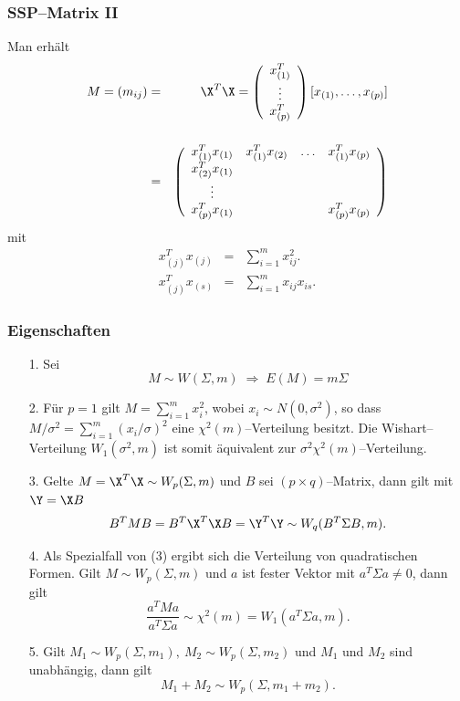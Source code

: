 \begin{frame}\frametitle{SSP--Matrix II}
\scriptsize
Man erh\"{a}lt
  \begin{eqnarray*}%
M  =  (m_{ij}) & = & \X^T \X = \left(
    \begin{array}{c}
    x^T_{(1)}\\ \vdots \\ x_{(p)}^T
    \end{array} \right)
%
[x_{(1)},\ldots,x_{(p)}]\\[0.5cm] & = &
\left(
    \begin{array}{cccc}
    x^T_{(1)}x_{(1)} & x^T_{(1)}x_{(2)}& \ldots & x^T_{(1)}x_{(p)}\\
    x_{(2)}^Tx_{(1)}\\
    \vdots \\
    x^T_{(p)}x_{(1)} & & &x^T_{(p)}x_{(p)}
    \end{array}
\right)
  \end{eqnarray*}
mit
\begin{eqnarray*}%
x^T_{(j)}x_{(j)} & = & \sum^m_{i=1}x^2_{ij}.\\
x^T_{(j)}x_{(s)} & = & \sum^m_{i=1}x_{ij}x_{is}.
\end{eqnarray*}
\end{frame}

\begin{frame}\frametitle{Eigenschaften}
\scriptsize
\begin{enumerate}
\item [1.] Sei \[M\sim W(\Sigma,m) \;\Longrightarrow \;E(M)= m\Sigma\]
\item [2.] F\"{u}r $p = 1$ gilt $M = \sum\limits^m_{i=1}x^2_i$,
wobei $x_i\sim N(0,\sigma^2)$, so dass $M/\sigma^2 =
\sum\limits^m_{i=1}(x_i/\sigma)^2$ eine $\chi^2(m)$--Verteilung
besitzt. Die Wishart--Verteilung $W_1(\sigma^2, m)$ ist somit
\"{a}quivalent zur $\sigma^2\chi^2(m)$--Verteilung.
\item [3.] Gelte $M = \X^T \X \sim W_p(\Sigma,m)$ und $B$ sei
$(p\times q)$--Matrix, dann gilt mit $\Y = \X B$
\[
B^T M B = B^T \X^T \X B = \Y^T \Y \sim W_q(B^T\Sigma B,m).
\]

\item [4.] Als Spezialfall von (3) ergibt sich die Verteilung von
quadratischen Formen. Gilt $M\sim W_p(\Sigma, m)$ und $a$ ist fester
Vektor mit $a^T\Sigma a \neq 0$, dann gilt
\[
\frac{a^T M a}{a^T\Sigma a} \sim \chi^2(m) = W_1(a^T\Sigma a,m).
\]

\item [5.] Gilt $M_1 \sim W_p(\Sigma, m_1),\ M_2 \sim W_p(\Sigma, m_2)$
und $M_1$ und $M_2$ sind unabh\"{a}ngig, dann gilt
\[
M_1 + M_2 \sim W_p(\Sigma, m_1 + m_2).
\]
\end{enumerate}
\end{frame}


